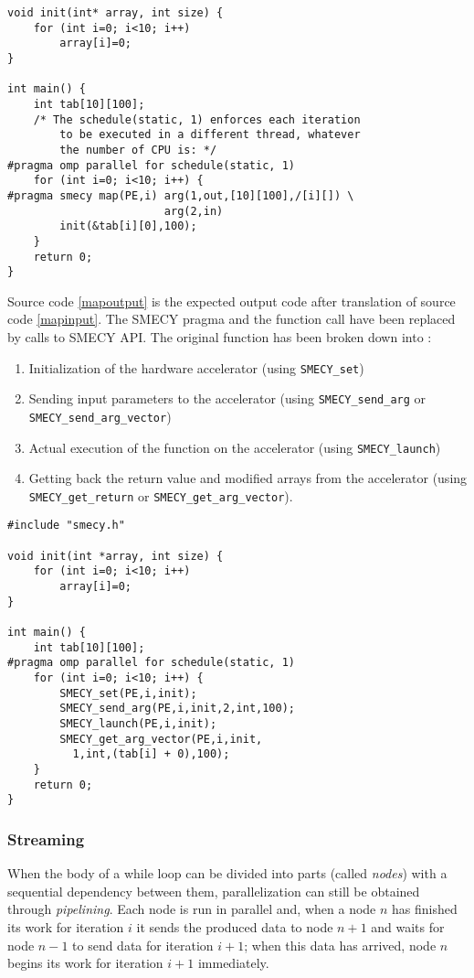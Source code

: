 \documentclass[a4paper]{article}
\begin{document}
	\begin{lstlisting}[label=mapinput,caption={Input code with hardware mapping pragma.}]
void init(int* array, int size) {
	for (int i=0; i<10; i++)
		array[i]=0;
}

int main() {
	int tab[10][100];
    /* The schedule(static, 1) enforces each iteration
        to be executed in a different thread, whatever
        the number of CPU is: */
#pragma omp parallel for schedule(static, 1)
	for (int i=0; i<10; i++) {
#pragma smecy map(PE,i) arg(1,out,[10][100],/[i][]) \
                        arg(2,in)
		init(&tab[i][0],100);
	}
	return 0;
}
	\end{lstlisting}
	
	Source code \ref{mapoutput} is the expected output code after translation of source code \ref{mapinput}. The SMECY pragma and the function call have been replaced by calls to SMECY API. The original function has been broken down into :
	\begin{enumerate}
		\item Initialization of the hardware accelerator (using \verb+SMECY_set+)
		\item Sending input parameters to the accelerator (using \verb+SMECY_send_arg+ or \verb+SMECY_send_arg_vector+)
		\item Actual execution of the function on the accelerator (using \verb+SMECY_launch+)
		\item Getting back the return value and modified arrays from the accelerator (using \verb+SMECY_get_return+ or \verb+SMECY_get_arg_vector+).
	\end{enumerate}
	
	\begin{lstlisting}[label=mapoutput,caption={Expected output code.}]
#include "smecy.h"

void init(int *array, int size) {
	for (int i=0; i<10; i++)
		array[i]=0;
}

int main() {
	int tab[10][100];
#pragma omp parallel for schedule(static, 1)
	for (int i=0; i<10; i++) {
		SMECY_set(PE,i,init);
		SMECY_send_arg(PE,i,init,2,int,100);
		SMECY_launch(PE,i,init);
		SMECY_get_arg_vector(PE,i,init,
		  1,int,(tab[i] + 0),100);
	}
	return 0;
}
	\end{lstlisting}
	
	\subsubsection{Streaming}
	When the body of a while loop can be divided into parts (called \emph{nodes}) with a sequential dependency between them, parallelization can still be obtained through \emph{pipelining}. Each node is run in parallel and, when a node $n$ has finished its work for iteration $i$ it sends the produced data to node $n+1$ and waits for node $n-1$ to send data for iteration $i+1$; when this data has arrived, node $n$ begins its work for iteration $i+1$ immediately.
	
\end{document}
